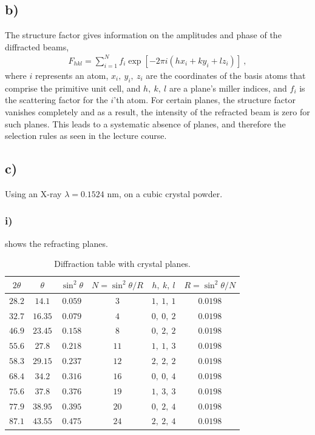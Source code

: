 \documentclass[a4paper]{article}
\begin{document}
	\subsection{b)}
	The structure factor gives information on the amplitudes and phase of the diffracted beams,
	\begin{align}
		F_{hkl} = \sum\limits_{i=1}^{N} f_{i} \exp\left[ -2 \pi i (h x_{i} + k y_{i} + l z_{i}) \right]~,
	\end{align}
	where $i$ represents an atom, $x_{i},~ y_{i},~ z_{i}$ are the coordinates of the basis atoms that comprise the primitive unit cell, and $h,~ k,~ l$ are a plane's miller indices, and $f_{i}$ is the scattering factor for the $i$'th atom. For certain planes, the structure factor vanishes completely and as a result, the intensity of the refracted beam is zero for such planes. This leads to a systematic absence of planes, and therefore the selection rules as seen in the lecture course.
	
	\subsection{c)}
	Using an X-ray $\lambda = 0.1524$ nm, on a cubic crystal powder.
	\subsubsection{i)}
	 shows the refracting planes.
	\begin{table}
		\centering
		\caption{Diffraction table with crystal planes.}
		\label{t:diff}
		\begin{tabular}{cccccc}
			\toprule
			$2\theta$ & $\theta$ & $\sin^{2}\theta$ & $N = \sin^{2}\theta/R$ & $h,~ k,~ l$ & $ R = \sin^{2}\theta/N $\\
			\midrule
			$28.2$ & $14.1$  & $0.059$ & $3$  & $1,~1,~1$ & $ 0.0198 $ \\
			$32.7$ & $16.35$ & $0.079$ & $4$  & $0,~0,~2$ & $ 0.0198 $ \\
			$46.9$ & $23.45$ & $0.158$ & $8$  & $0,~2,~2$ & $ 0.0198 $ \\
			$55.6$ & $27.8$  & $0.218$ & $11$ & $1,~1,~3$ & $ 0.0198 $ \\
			$58.3$ & $29.15$ & $0.237$ & $12$ & $2,~2,~2$ & $ 0.0198 $ \\
			$68.4$ & $34.2$  & $0.316$ & $16$ & $0,~0,~4$ & $ 0.0198 $ \\
			$75.6$ & $37.8$  & $0.376$ & $19$ & $1,~3,~3$ & $ 0.0198 $ \\
			$77.9$ & $38.95$ & $0.395$ & $20$ & $0,~2,~4$ & $ 0.0198 $ \\
			$87.1$ & $43.55$ & $0.475$ & $24$ & $2,~2,~4$ & $ 0.0198 $ \\
			\bottomrule
		\end{tabular}
	\end{table}
\end{document}
